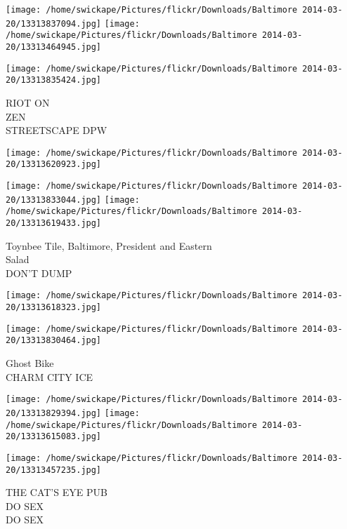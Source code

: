 \documentclass[10pt,letterpaper]{article}
\begin{document}
\texttt{[image: /home/swickape/Pictures/flickr/Downloads/Baltimore 2014-03-20/13313837094.jpg]}
\texttt{[image: /home/swickape/Pictures/flickr/Downloads/Baltimore 2014-03-20/13313464945.jpg]}

\vspace{0.25in}
\texttt{[image: /home/swickape/Pictures/flickr/Downloads/Baltimore 2014-03-20/13313835424.jpg]}

RIOT ON\\
ZEN\\
STREETSCAPE DPW\\
\pagebreak

\texttt{[image: /home/swickape/Pictures/flickr/Downloads/Baltimore 2014-03-20/13313620923.jpg]}

\vspace{0.25in}
\texttt{[image: /home/swickape/Pictures/flickr/Downloads/Baltimore 2014-03-20/13313833044.jpg]}
\texttt{[image: /home/swickape/Pictures/flickr/Downloads/Baltimore 2014-03-20/13313619433.jpg]}

Toynbee Tile, Baltimore, President and Eastern\\
Salad\\
DON'T DUMP\\
\pagebreak

\texttt{[image: /home/swickape/Pictures/flickr/Downloads/Baltimore 2014-03-20/13313618323.jpg]}

\vspace{0.25in}
\texttt{[image: /home/swickape/Pictures/flickr/Downloads/Baltimore 2014-03-20/13313830464.jpg]}

Ghost Bike\\
CHARM CITY ICE\\
\pagebreak

\texttt{[image: /home/swickape/Pictures/flickr/Downloads/Baltimore 2014-03-20/13313829394.jpg]}
\texttt{[image: /home/swickape/Pictures/flickr/Downloads/Baltimore 2014-03-20/13313615083.jpg]}

\texttt{[image: /home/swickape/Pictures/flickr/Downloads/Baltimore 2014-03-20/13313457235.jpg]}

THE CAT'S EYE PUB\\
DO SEX\\
DO SEX\\
\pagebreak
\end{document}
